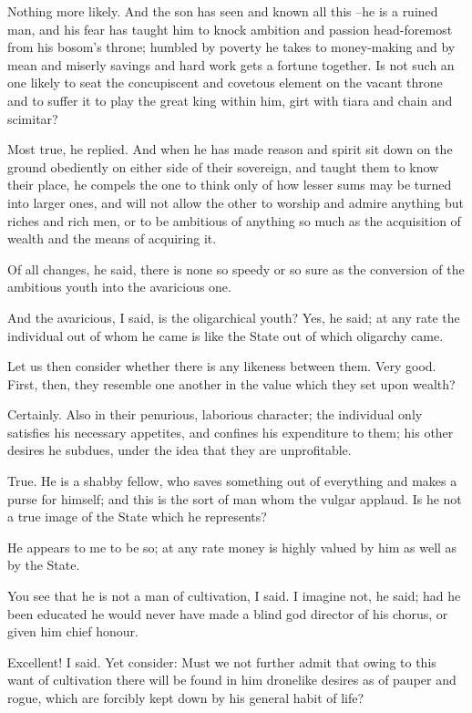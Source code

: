 Nothing more likely.
And the son has seen and known all this --he is a ruined man, and his fear has taught him to knock ambition and passion head-foremost from his bosom's throne; humbled by poverty he takes to money-making and by mean and miserly savings and hard work gets a fortune together. Is not such an one likely to seat the concupiscent and covetous element on the vacant throne and to suffer it to play the great king within him, girt with tiara and chain and scimitar?

Most true, he replied.
And when he has made reason and spirit sit down on the ground obediently on either side of their sovereign, and taught them to know their place, he compels the one to think only of how lesser sums may be turned into larger ones, and will not allow the other to worship and admire anything but riches and rich men, or to be ambitious of anything so much as the acquisition of wealth and the means of acquiring it.

Of all changes, he said, there is none so speedy or so sure as the conversion of the ambitious youth into the avaricious one.

And the avaricious, I said, is the oligarchical youth?
Yes, he said; at any rate the individual out of whom he came is like the State out of which oligarchy came.

Let us then consider whether there is any likeness between them.
Very good.
First, then, they resemble one another in the value which they set upon wealth?

Certainly.
Also in their penurious, laborious character; the individual only satisfies his necessary appetites, and confines his expenditure to them; his other desires he subdues, under the idea that they are unprofitable.

True.
He is a shabby fellow, who saves something out of everything and makes a purse for himself; and this is the sort of man whom the vulgar applaud. Is he not a true image of the State which he represents?

He appears to me to be so; at any rate money is highly valued by him as well as by the State.

You see that he is not a man of cultivation, I said.
I imagine not, he said; had he been educated he would never have made a blind god director of his chorus, or given him chief honour.

Excellent! I said. Yet consider: Must we not further admit that owing to this want of cultivation there will be found in him dronelike desires as of pauper and rogue, which are forcibly kept down by his general habit of life?

